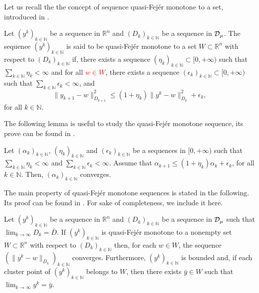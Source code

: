 Let us recall the the concept of  sequence  quasi-Fej\'er  monotone to a set, introduced in  \cite{CombettesVu2013}.
\begin{definition} \label{def:QuasiFejer}
	Let $(y^k)_{k\in\mathbb{N}}$ be a sequence in $\mathbb{R}^n$ and   $(D_k)_{k\in\mathbb{N}}$ be  a sequence in ${\cal D}_{\mu}$.  The sequence $(y^k)_{k\in\mathbb{N}}$ is said to be quasi-Fej\'er  monotone to a set $W\subset \mathbb{R}^n$ with respect to  $(D_k)_{k\in\mathbb{N}}$ if, there exists  a sequence $(\eta_k)_{k\in\mathbb{N}}\subset [0, +\infty)$ such that $\sum_{k\in \mathbb{N}}\eta_k<\infty$ and for  all \textcolor{red}{$w\in W$}, there exists a sequence $(\epsilon_k)_{k\in\mathbb{N}}\subset[0, +\infty)$ such that  $\sum_{k\in \mathbb{N}}\epsilon_k<\infty$, and
	\[
		\|y_{k+1}-w\|_{D_{k+1}}^2\leq (1+\eta_k) \|y^k-w\|_{D_k}^2+\epsilon_k,
	\]
	for    all $k\in \mathbb{N}$.
\end{definition}

The following lemma is useful to study the  quasi-Fej\'er  monotone sequence, its prove can be found in \cite[Lemma 2.2.2]{PolyakLivro1987}.
\begin{lemma} \label{le:pl}
	Let $(\alpha_k)_{k\in\mathbb{N}}$, $(\eta_k)_{k\in\mathbb{N}}$ and $(\epsilon_k)_{k\in\mathbb{N}}$ be a sequences in $[0, +\infty)$  such that $\sum_{k\in \mathbb{N}}\eta_k<\infty$ and $\sum_{k\in \mathbb{N}}\epsilon_k<\infty$. Assume that $\alpha_{k+1}\leq (1 +\eta_k)\alpha_k+\epsilon_k$, for all $k\in {\mathbb N}$. Then, $(\alpha_k)_{k\in\mathbb{N}}$ converges.
\end{lemma}

The main property of  quasi-Fej\'er  monotone sequences is stated in the following. Its proof can be found in \cite[Proposition~3.2 and Theorem 3.3]{CombettesVu2013}. For sake of completeness, we include it here.

\begin{theorem}\label{teo.qf}
	Let $(y^k)_{k\in\mathbb{N}}$ be a sequence in $\mathbb{R}^n$ and   $(D_k)_{k\in\mathbb{N}}$ be  a sequence in ${\cal D}_{\mu}$ such that $\lim_{k\rightarrow\infty}D_k={\bar D}$.   If $(y^k)_{k\in\mathbb{N}}$ is quasi-Fej\'er  monotone to a nonempty set $W\subset  \mathbb{R}^n$ with respect to $(D_k)_{k\in\mathbb{N}}$ then,  for each  $w\in W$,    the sequence  $(\|y^{k}-w\|_{D_{k}})_{k\in\mathbb{N}}$ converges. Furthermore, $(y^k)_{k\in\mathbb{N}}$ is bounded and, if each  cluster point of $(y^k)_{k\in\mathbb{N}}$ belongs to $W$, then there exists ${\bar y}\in W$ such that $\lim_{k\rightarrow\infty}y^k={\bar y}$.
\end{theorem}

